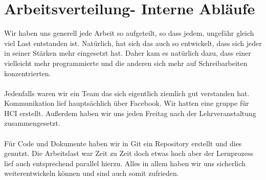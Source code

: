 \documentclass[runningheads,a4paper]{llncs}
\begin{document}
\section{Arbeitsverteilung- Interne Abläufe}
Wir haben uns generell jede Arbeit so aufgeteilt, so dass jedem, ungefähr gleich viel Last entstanden ist. Natürlich, hat sich das auch so entwickelt, dass sich jeder in seiner Stärken mehr eingesetzt hat. Daher kam es natürlich dazu, dass einer vielleicht mehr programmierte und die anderen sich mehr auf Schreibarbeiten konzentrierten. \\\\Jedenfalls waren wir ein Team das sich eigentlich ziemlich gut verstanden hat. Kommunikation lief hauptsächlich über Facebook. Wir hatten eine gruppe für HCI erstellt. Außerdem haben wir uns jeden Freitag nach der Lehrveranstaltung zusammengesetzt. \\\\Für Code und Dokumente haben wir in Git ein Repository erstellt und dies genutzt.  Die Arbeitslast war Zeit zu Zeit doch etwas hoch aber der Lernprozess lief auch entsprechend parallel hierzu. Alles in allem haben wir uns sicherlich weiterentwickeln können und sind auch somit zufrieden. 
\end{document}

